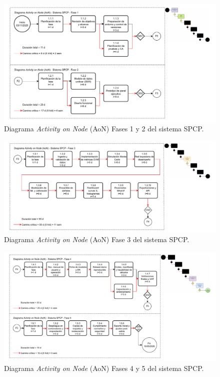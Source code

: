 \documentclass[12pt]
{charter}
\begin{document}
\FloatBarrier

\begin{figure}[ht]
  \centering
  \includegraphics[width=\textwidth]{Figuras/TF_AoN_01_01.drawio.pdf}
  \caption{Diagrama \textit{Activity on Node} (AoN) Fases 1 y 2 del sistema SPCP.}
    \label{fig:TF_AoN_01_01}
\end{figure}

\FloatBarrier

\begin{figure}[ht]
  \centering
  \includegraphics[width=\textwidth]{Figuras/TF_AoN_01_02.drawio.pdf}
    \caption{Diagrama \textit{Activity on Node} (AoN) Fase 3 del sistema SPCP.}
    \label{fig:TF_AoN_01_02}
\end{figure}

\FloatBarrier

\begin{figure}[ht]
  \centering
  \includegraphics[width=\textwidth]{Figuras/TF_AoN_01_03.drawio.pdf}
  \caption{Diagrama \textit{Activity on Node} (AoN) Fases 4 y 5 del sistema SPCP.}
    \label{fig:TF_AoN_01_03}
\end{figure}
\end{document}
